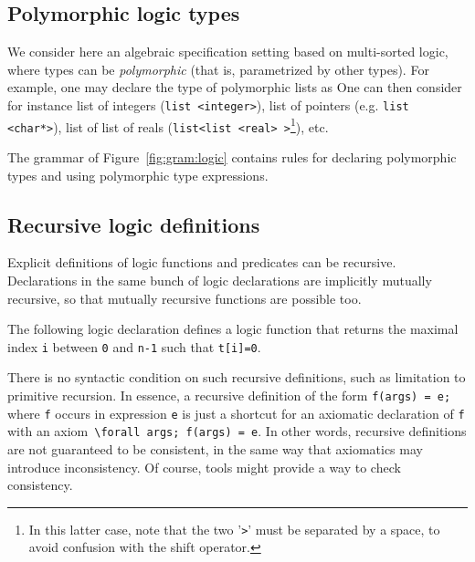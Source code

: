 
\subsection{Polymorphic logic types}\label{sec:polym-logic-types}

We consider here an algebraic specification setting based on
multi-sorted logic, where types can be \emph{polymorphic} (that is, 
parametrized by other types). For example, one may declare the type of
polymorphic lists as
One can then consider for
instance list of integers (\lstinline|list <integer>|), list of pointers
(e.g. \lstinline|list <char*>|), list of list of reals
(\lstinline|list<list <real> >|\footnote{In this latter case, note that the two
  '\texttt{>}' must be separated by a space, to avoid confusion with
  the shift operator.}), etc.

The grammar of Figure~\ref{fig:gram:logic} contains rules for
declaring polymorphic types and using polymorphic type
expressions.


\subsection{Recursive logic definitions}
Explicit definitions of logic functions and predicates can be
recursive. Declarations in the same bunch of logic declarations are
implicitly mutually recursive, so that mutually recursive functions are
possible too.

\begin{example}
  The following logic declaration
  defines a logic function that returns the maximal index \lstinline|i| between
  \lstinline|0| and \lstinline|n-1| such that \lstinline|t[i]=0|.
\end{example}

%  

There is no syntactic condition on such recursive
definitions, such as limitation to primitive recursion. In essence, a
recursive definition of the form \lstinline+f(args) = e;+ where
\lstinline+f+ occurs in expression \lstinline+e+ is just a shortcut
for an axiomatic declaration of \lstinline+f+ with an 
axiom~\lstinline+\forall args; f(args) = e+.  In other words, recursive
definitions are not guaranteed to be consistent, in the same way that
axiomatics may introduce inconsistency. Of course, tools might provide
a way to check consistency.

